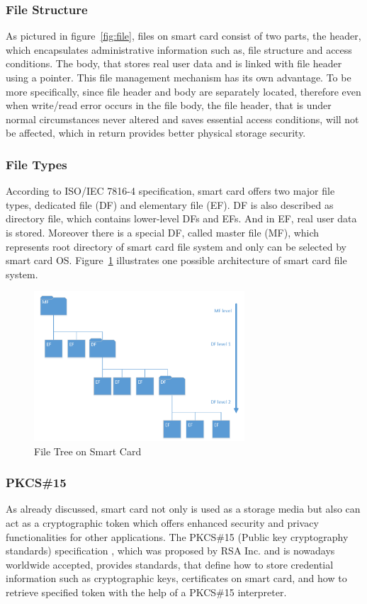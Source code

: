 \subsubsection{File Structure}
As pictured in figure~\ref{fig:file}, files on smart card consist of two parts,  the header, which encapsulates administrative information such as, file structure and access conditions. The body, that stores real user data and is linked with file header using a pointer. This file management mechanism has its own advantage. To be more specifically, since file header and body are separately located, therefore even when write/read error occurs in the file body, the file header, that is under normal circumstances never altered and saves essential access conditions, will not be affected, which in return provides better physical storage security.

\subsubsection{File Types}
According to ISO/IEC 7816-4 specification, smart card offers two major file types, dedicated file (DF) and elementary file (EF). DF is also described as directory file, which contains lower-level DFs and EFs. And in EF, real user data is stored. Moreover there is a special DF, called master file (MF), which represents root directory of smart card file system and only can be selected by smart card OS. Figure~\ref{fig:file-structure} illustrates one possible architecture of smart card file system.

\begin{figure}[!htbp]
	\centering
	\includegraphics[width=0.7\textwidth]{file-structure}
		\caption{File Tree on Smart Card \cite{handbuch}}
	\label{fig:file-structure}
\end{figure}

\subsubsection{PKCS{\#}15}
As already discussed, smart card not only is used as a storage media but also can act as a cryptographic token which offers enhanced security and privacy functionalities for other applications. The PKCS\#15 (Public key cryptography standards) specification \cite{pkcs}, which was proposed by RSA Inc. and is nowadays worldwide accepted, provides standards, that define how to store credential information such as cryptographic keys, certificates on smart card, and how to retrieve specified token with the help of a PKCS\#15 interpreter.
 
